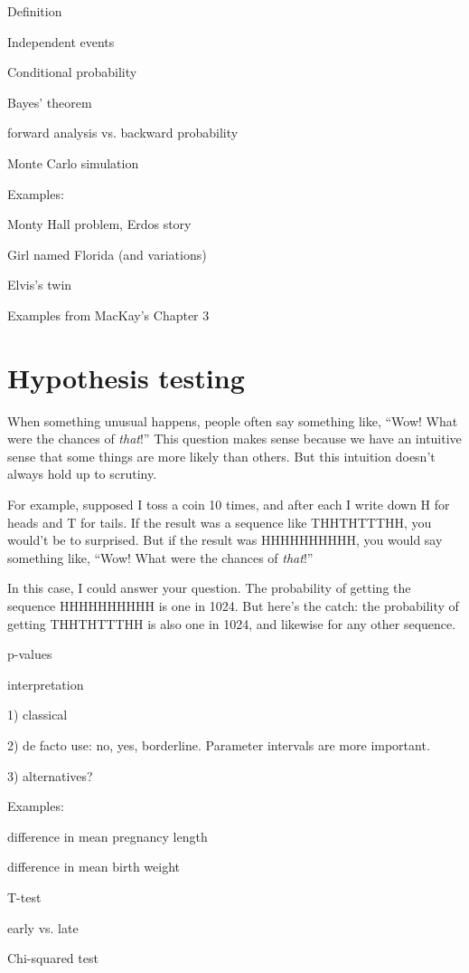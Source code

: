 \documentclass[10pt]{book}
\begin{document}
Definition

Independent events

Conditional probability

Bayes' theorem

    forward analysis vs. backward probability

Monte Carlo simulation

Examples:

Monty Hall problem, Erdos story

Girl named Florida (and variations)

Elvis's twin

Examples from MacKay's Chapter 3


\chapter{Hypothesis testing}

When something unusual happens, people often say something
like, ``Wow!  What were the chances of {\em that}!''  This question
makes sense because we have an intuitive sense that some things
are more likely than others.  But this intuition doesn't
always hold up to scrutiny.

For example, supposed I toss a coin 10 times, and after each I write
down H for heads and T for tails.  If the result was a sequence like
THHTHTTTHH, you would't be to surprised.  But if the result was
HHHHHHHHHH, you would say something like, ``Wow!  What were the
chances of {\em that}!''

In this case, I could answer your question.  The probability of
getting the sequence HHHHHHHHHH is one in 1024.  But here's the catch:
the probability of getting THHTHTTTHH is also one in 1024, and
likewise for any other sequence.

p-values

interpretation

1) classical

2) de facto use: no, yes, borderline.  Parameter intervals are more important.

3) alternatives?



Examples:

   difference in mean pregnancy length

   difference in mean birth weight

   T-test

   early vs. late

   Chi-squared test
\end{document}
